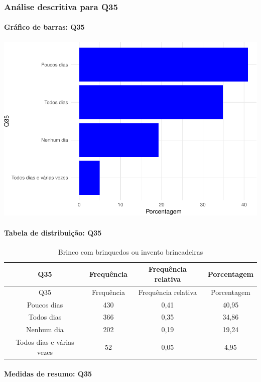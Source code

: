\documentclass[]{article}
\let\oldparagraph\paragraph
\renewcommand{\paragraph}[1]{\oldparagraph{#1}\mbox{}}
\begin{document}
\hypertarget{anuxe1lise-descritiva-para-q35}{%
\subsubsection{Análise descritiva para Q35}\label{anuxe1lise-descritiva-para-q35}}

\hypertarget{gruxe1fico-de-barras-q35}{%
\paragraph{Gráfico de barras: Q35}\label{gruxe1fico-de-barras-q35}}

\begin{center}\includegraphics[width=0.75\linewidth]{relatorio_covid19_files/figure-latex/unnamed-chunk-1249-1} \end{center}

\hypertarget{tabela-de-distribuiuxe7uxe3o-q35}{%
\paragraph{Tabela de distribuição: Q35}\label{tabela-de-distribuiuxe7uxe3o-q35}}

\begin{longtable}[]{@{}cccc@{}}
\caption{\label{tab:unnamed-chunk-1250}Brinco com brinquedos ou invento brincadeiras}\tabularnewline
\toprule
Q35 & Frequência & Frequência relativa & Porcentagem\tabularnewline
\midrule
\endfirsthead
\toprule
Q35 & Frequência & Frequência relativa & Porcentagem\tabularnewline
\midrule
\endhead
Poucos dias & 430 & 0,41 & 40,95\tabularnewline
Todos dias & 366 & 0,35 & 34,86\tabularnewline
Nenhum dia & 202 & 0,19 & 19,24\tabularnewline
Todos dias e várias vezes & 52 & 0,05 & 4,95\tabularnewline
\bottomrule
\end{longtable}

\hypertarget{medidas-de-resumo-q35}{%
\paragraph{Medidas de resumo: Q35}\label{medidas-de-resumo-q35}}
\end{document}
